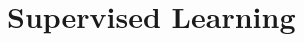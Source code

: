 \part{Supervised Learning}

\renewcommand{\thispartpath}{\basepath/supervised}



\renewcommand{\thischapterpath}{\thispartpath/svm}

\renewcommand{\thischapterpath}{\thispartpath/networks}


